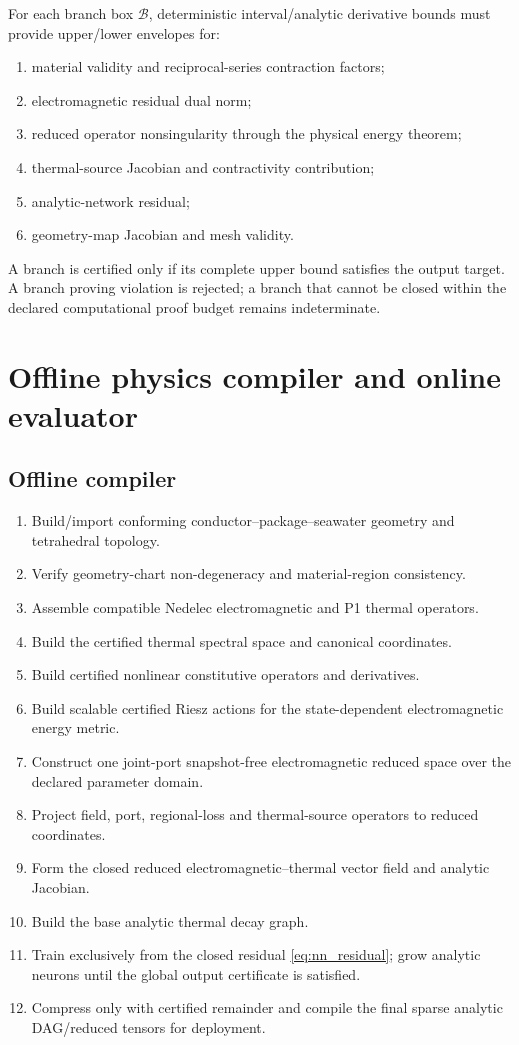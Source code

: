 \documentclass[11pt]{article}
\theoremstyle{remark}
\begin{document}
For each branch box \(\mathcal B\), deterministic interval/analytic derivative bounds must provide upper/lower envelopes for:
\begin{enumerate}
\item material validity and reciprocal-series contraction factors;
\item electromagnetic residual dual norm;
\item reduced operator nonsingularity through the physical energy theorem;
\item thermal-source Jacobian and contractivity contribution;
\item analytic-network residual;
\item geometry-map Jacobian and mesh validity.
\end{enumerate}
A branch is certified only if its complete upper bound satisfies the output target. A branch proving violation is rejected; a branch that cannot be closed within the declared computational proof budget remains indeterminate.

\section{Offline physics compiler and online evaluator}

\subsection{Offline compiler}
\begin{enumerate}
\item Build/import conforming conductor--package--seawater geometry and tetrahedral topology.
\item Verify geometry-chart non-degeneracy and material-region consistency.
\item Assemble compatible Nedelec electromagnetic and P1 thermal operators.
\item Build the certified thermal spectral space and canonical coordinates.
\item Build certified nonlinear constitutive operators and derivatives.
\item Build scalable certified Riesz actions for the state-dependent electromagnetic energy metric.
\item Construct one joint-port snapshot-free electromagnetic reduced space over the declared parameter domain.
\item Project field, port, regional-loss and thermal-source operators to reduced coordinates.
\item Form the closed reduced electromagnetic--thermal vector field and analytic Jacobian.
\item Build the base analytic thermal decay graph.
\item Train exclusively from the closed residual \eqref{eq:nn_residual}; grow analytic neurons until the global output certificate is satisfied.
\item Compress only with certified remainder and compile the final sparse analytic DAG/reduced tensors for deployment.
\end{enumerate}
\end{document}

